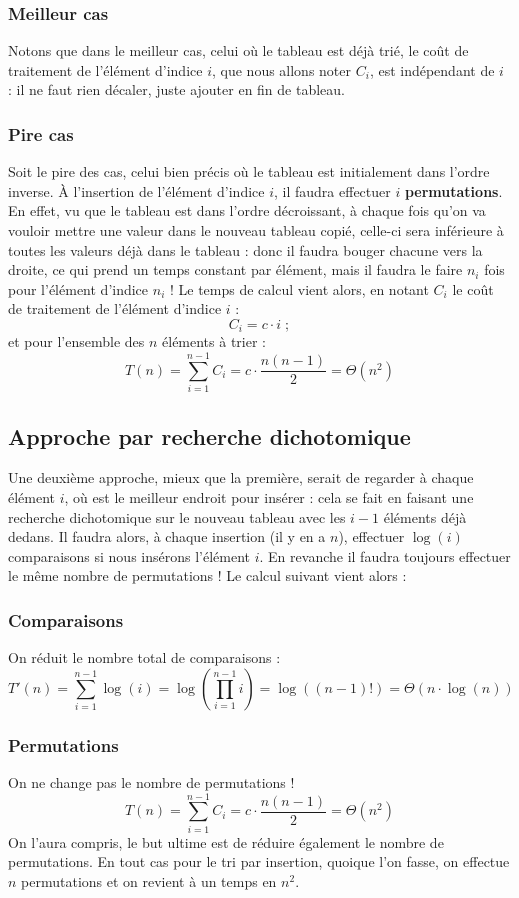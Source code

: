 \documentclass[12pt,a4paper]{book}
\begin{document}
\subsubsection{Meilleur cas}
Notons que dans le meilleur cas, celui où le tableau est déjà trié, le coût de traitement de l'élément d'indice $i$, que nous allons noter $C_i$, est indépendant de $i$ : il ne faut rien décaler, juste ajouter en fin de tableau.

\subsubsection{Pire cas}
Soit le pire des cas, celui bien précis où le tableau est initialement dans l'ordre inverse. À l'insertion de l'élément d'indice $i$, il faudra effectuer $i$ \textbf{permutations}. En effet, vu que le tableau est dans l'ordre décroissant, à chaque fois qu'on va vouloir mettre une valeur dans le nouveau tableau copié, celle-ci sera inférieure à toutes les valeurs déjà dans le tableau : donc il faudra bouger chacune vers la droite, ce qui prend un temps constant par élément, mais il faudra le faire $n_i$ fois pour l'élément d'indice $n_i$ ! Le temps de calcul vient alors, en notant $C_i$ le coût de traitement de l'élément d'indice $i$ :
$$C_i = c \cdot i \; ;$$
et pour l'ensemble des $n$ éléments à trier :
$$T(n) = \sum_{i=1} ^{n-1} C_i = c\cdot \dfrac{n(n-1)}{2} = \Theta(n^2)$$
\subsection{Approche par recherche dichotomique}
Une deuxième approche, mieux que la première, serait de regarder à chaque élément $i$, où est le meilleur endroit pour insérer : cela se fait en faisant une recherche dichotomique sur le nouveau tableau avec les $i-1$ éléments déjà dedans. Il faudra alors, à chaque insertion (il y en a $n$), effectuer $\log(i)$ comparaisons si nous insérons l'élément $i$. En revanche il faudra toujours effectuer le même nombre de permutations ! Le calcul suivant vient alors :
\subsubsection{Comparaisons}
On réduit le nombre total de comparaisons : 
$$T'(n) = \sum_{i=1} ^{n-1} \log(i) = \log\left(\prod_{i=1}^{n-1} i\right) = \log\left((n-1)!\right) = \Theta\left(n\cdot \log(n)\right)$$
\subsubsection{Permutations}
On ne change pas le nombre de permutations !
$$T(n) = \sum_{i=1} ^{n-1} C_i = c\cdot \dfrac{n(n-1)}{2} = \Theta(n^2)$$
On l'aura compris, le but ultime est de réduire également le nombre de permutations. En tout cas pour le tri par insertion, quoique l'on fasse, on effectue $n$ permutations et on revient à un temps en  $n^2$.
\end{document}
